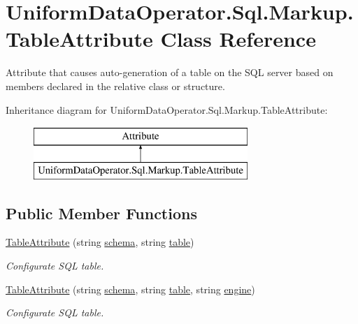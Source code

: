 \hypertarget{class_uniform_data_operator_1_1_sql_1_1_markup_1_1_table_attribute}{}\section{Uniform\+Data\+Operator.\+Sql.\+Markup.\+Table\+Attribute Class Reference}
\label{class_uniform_data_operator_1_1_sql_1_1_markup_1_1_table_attribute}


Attribute that causes auto-\/generation of a table on the S\+QL server based on members declared in the relative class or structure.  


Inheritance diagram for Uniform\+Data\+Operator.\+Sql.\+Markup.\+Table\+Attribute\+:\begin{figure}[H]
\begin{center}
\leavevmode
\includegraphics[height=2.000000cm]{d3/d61/class_uniform_data_operator_1_1_sql_1_1_markup_1_1_table_attribute}
\end{center}
\end{figure}
\subsection*{Public Member Functions}
\begin{DoxyCompactItemize}
\item 
\mbox{\hyperlink{class_uniform_data_operator_1_1_sql_1_1_markup_1_1_table_attribute_a3cfe088f4e36ab209cec341c10917ff6}{Table\+Attribute}} (string \mbox{\hyperlink{class_uniform_data_operator_1_1_sql_1_1_markup_1_1_table_attribute_ac0f169e34020d96155a9fd961b207391}{schema}}, string \mbox{\hyperlink{class_uniform_data_operator_1_1_sql_1_1_markup_1_1_table_attribute_afbaa6ebc381e83a2be76e904f417d7ac}{table}})
\begin{DoxyCompactList}\small\item\em Configurate S\+QL table. \end{DoxyCompactList}\item 
\mbox{\hyperlink{class_uniform_data_operator_1_1_sql_1_1_markup_1_1_table_attribute_a085ad4c643842f099ce19c6113e2475f}{Table\+Attribute}} (string \mbox{\hyperlink{class_uniform_data_operator_1_1_sql_1_1_markup_1_1_table_attribute_ac0f169e34020d96155a9fd961b207391}{schema}}, string \mbox{\hyperlink{class_uniform_data_operator_1_1_sql_1_1_markup_1_1_table_attribute_afbaa6ebc381e83a2be76e904f417d7ac}{table}}, string \mbox{\hyperlink{class_uniform_data_operator_1_1_sql_1_1_markup_1_1_table_attribute_a6dd17faa4c4e02428620528929a2d497}{engine}})
\begin{DoxyCompactList}\small\item\em Configurate S\+QL table. \end{DoxyCompactList}\end{DoxyCompactItemize}
